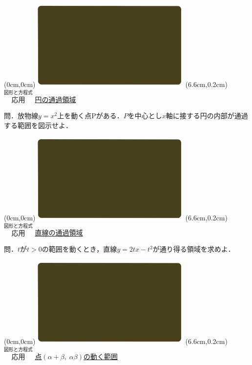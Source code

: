 \documentclass[10pt,
fleqn,
dvipdfmx,
uplatex
]{jsarticle}
\begin{document}
\bf\boldmath



\bf\boldmath

\at(0cm,0cm){\includegraphics[width=8cm,bb=0 0 1920 1080]{./youtube/thumbnails/templates/smart_background/図形と方程式.jpeg}}
\at(6.6cm,0.2cm){\small\color{bradorange}$\overset{\text{図形と方程式}}{\text{応用}}$}
{\color{orange}\huge\underline{円の通過領域}}\vspace{0.3zw}

\Large 
問．放物線$y=x^2$上を動く点$\text{P}$がある．$P$を中心とし$x$軸に接する円の内部が通過する範囲を図示せよ．

\newpage

\at(0cm,0cm){\includegraphics[width=8cm,bb=0 0 1920 1080]{./youtube/thumbnails/templates/smart_background/図形と方程式.jpeg}}
\at(6.6cm,0.2cm){\small\color{bradorange}$\overset{\text{図形と方程式}}{\text{応用}}$}
{\color{orange}\huge\underline{直線の通過領域}}\vspace{0.3zw}

\LARGE 
問．$t$が$t>0$の範囲を動くとき，直線$y=2tx-t^2$が通り得る領域を求めよ．

\newpage

\at(0cm,0cm){\includegraphics[width=8cm,bb=0 0 1920 1080]{./youtube/thumbnails/templates/smart_background/図形と方程式.jpeg}}
\at(6.6cm,0.2cm){\small\color{bradorange}$\overset{\text{図形と方程式}}{\text{応用}}$}
{\color{orange}\Large\underline{点$\left(\alpha +\beta ,\;\alpha \beta \right)$の動く範囲}}\vspace{0.3zw}
\end{document}
